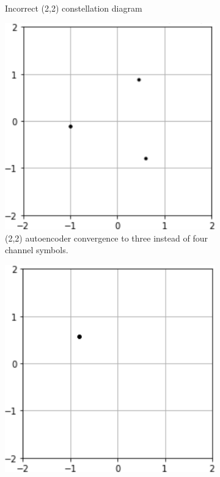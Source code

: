 \documentclass[12pt,onecolumn,letterpaper]{article}
\begin{document}
\begin{figure}[t!]
\begin{subfigure}[t]{0.2\textwidth}
       \caption{Incorrect (2,2) constellation diagram}
   \end{subfigure}
   \hfill
   \begin{subfigure}[t]{0.2\textwidth}
       \centering
       \includegraphics[width=\linewidth]{figures/l2_ae_inconsistent4.png}
       \caption{(2,2) autoencoder convergence to three instead of four channel symbols.}
   \end{subfigure}
   \hfill
   \begin{subfigure}[t]{0.2\textwidth}
       \centering
       \includegraphics[width=\linewidth]{figures/l2_ae4_2_inconsistent.png}

\end{subfigure}
\end{figure}
\end{document}
